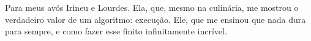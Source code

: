 Para meus avós Irineu e Lourdes.
\newline
\newline
Ela, que, mesmo na culinária, me mostrou o verdadeiro valor de um algoritmo: execução. Ele, que me ensinou que nada dura para sempre, e como fazer esse finito infinitamente incrível.
